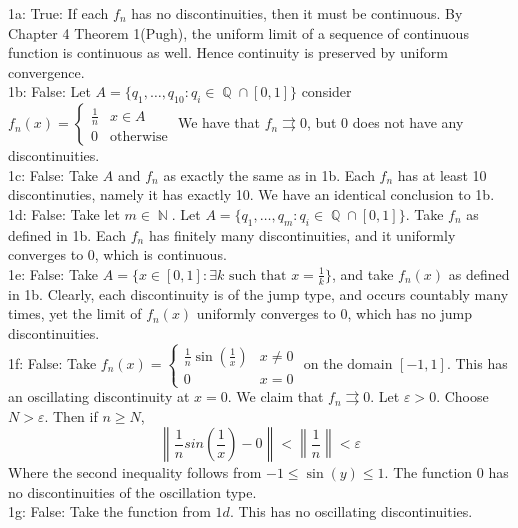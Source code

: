 \documentclass[letterpaper]{article}
\DeclareMathOperator{\N}{\mathbb{N}}
\DeclareMathOperator{\Q}{\mathbb{Q}}
\newcommand{\norm}[1]{\left\lVert#1\right\rVert}
\begin{document}
\noindent 1a: True: If each $f_n$ has no discontinuities, then it must be continuous. By Chapter 4 Theorem 1(Pugh), the uniform limit of a sequence of continuous function is continuous as well. Hence continuity is preserved by uniform convergence. 
\newline \\ 1b: False: Let $A = \{q_1,\dots,q_{10} : q_i\in \Q \cap [0,1] \}$ consider $f_n(x) =  \begin{cases} 
    \frac{1}{n} & x \in A \\
    0 & \text{otherwise} 
 \end{cases}
$ We have that $f_n \rightrightarrows 0$, but 0 does not have any discontinuities. 
\newline \\ 1c: False: Take $A$ and $f_n$ as exactly the same as in 1b. Each $f_n$ has at least 10 discontinuties, namely it has exactly 10. We have an identical conclusion to 1b. 
\newline \\ 1d: False: Take let $m\in \N$. Let $A = \{q_1 , \dots , q_m : q_i \in \Q \cap [0,1] \}$. Take $f_n$ as defined in 1b. Each $f_n$ has finitely many discontinuities, and it uniformly converges to 0, which is continuous. 
\newline \\ 1e: False: Take $A = \{x\in [0,1]: \exists k\text{ such that } x =\frac{1}{k}\}$, and take $f_n(x)$ as defined in 1b. Clearly, each discontinuity is of the jump type, and occurs countably many times, yet the limit of $f_n(x)$ uniformly converges to 0, which has no jump discontinuities. 
\newline \\ 1f: False: Take $f_n(x)=  \begin{cases} 
    \frac{1}{n} \sin(\frac{1}{x}) & x\neq 0 \\
    0 & x =0 
\end{cases}$ on the domain $[-1,1]$. This has an oscillating discontinuity at $x=0$. We claim that $f_n \rightrightarrows 0$. Let $\varepsilon>0$. Choose $N > \varepsilon$. Then if $n\geq N$, $$\norm{\frac{1}{n}sin(\frac{1}{x})-0}< \norm{\frac{1}{n}}<\varepsilon$$ Where the second inequality follows from $-1 \leq \sin(y)\leq 1$. The function 0 has no discontinuities of the oscillation type. 
\newline \\ 1g: False: Take the function from $1d$. This has no oscillating discontinuities.   
\end{document}
